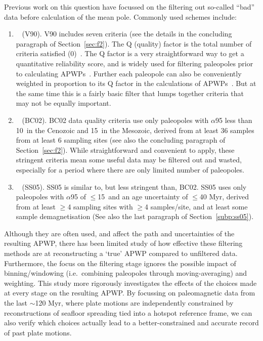 Previous work on this question have focussed on the filtering out so-called
``bad'' data before calculation of the mean pole. Commonly used schemes include:
\begin{enumerate}
  \item~\citet{v90} (V90). V90 includes seven criteria (see the details in the
    concluding paragraph of Section~\ref{sec:f2}). The Q (quality) factor is the
    total number of criteria satisfied (0)~\citep{v88}. The Q factor
    is a very straightforward way to get a quantitative reliability score, and
    is widely used for filtering paleopoles prior to calculating
    APWPs~\citep[e.g.][]{T12,Ma16,F19}. Further each paleopole can also be
    conveniently weighted in proportion to its Q factor in the calculations of
    APWPs~\citep{T92}. But at the same time this is a fairly basic filter that
    lumps together criteria that may not be equally important.
  \item~\citet{B02} (BC02). BC02 data quality criteria use only paleopoles with
    $\alpha$95 less than 10\degree\ in the Cenozoic and 15\degree\ in the
    Mesozoic, derived from at least 36 samples from at least 6 sampling sites
    (see also the concluding paragraph of Section~\ref{sec:f2}). While
    straightforward and convenient to apply, these stringent criteria mean some
    useful data may be filtered out and wasted, especially for a period where
    there are only limited number of paleopoles.
  \item~\citet{S05} (SS05). SS05 is similar to, but less stringent than, BC02.
    SS05 uses only paleopoles with $\alpha$95 of $\leq$15\degree\ and an age
    uncertainty of $\leq$40 Myr, derived from at least $\geq$4 sampling sites
    with $\geq$4 samples/site, and at least some sample demagnetisation (See
    also the last paragraph of Section~\ref{subp:ss05}).
\end{enumerate}

Although they are often used, and affect the path and uncertainties of the
resulting APWP, there has been limited study of how effective these filtering
methods are at reconstructing a `true' APWP compared to unfiltered data.
Furthermore, the focus on the filtering stage ignores the possible impact of
binning/windowing (i.e.\ combining paleopoles through moving-averaging) and
weighting. This study more rigorously investigates the effects of the choices
made at every stage on the resulting APWP\@. By focussing on paleomagnetic data
from the last $\sim$120 Myr, where plate motions are independently constrained
by reconstructions of seafloor spreading tied into a hotspot reference frame, we
can also verify which choices actually lead to a better-constrained and accurate
record of past plate motions.


